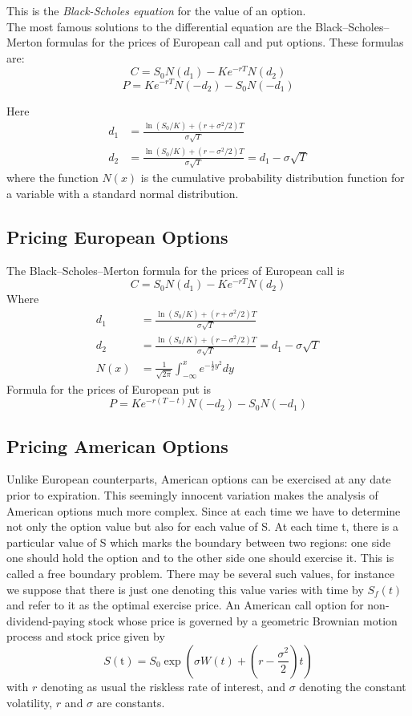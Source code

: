 \noindent This is the \emph{Black-Scholes equation} for the value of an option.\\[2mm]
The most famous solutions to the differential equation are the Black–Scholes–Merton formulas for the prices of European call and put options. These formulas are:\\
	$$
	C=S_0N(d_1)- Ke^{-rT} N(d_2)
	$$
	$$
	P= Ke^{-rT} N(-d_2)- S_0N(-d_1)
	$$

Here
$$
\begin{aligned}
	d_{1} &=\frac{\ln \left(S_{0} / K\right)+\left(r+\sigma^{2} / 2\right) T}{\sigma \sqrt{T}} \\
	d_{2} &=\frac{\ln \left(S_{0} / K\right)+\left(r-\sigma^{2} / 2\right) T}{\sigma \sqrt{T}}=d_{1}-\sigma \sqrt{T}
\end{aligned}
$$
where the function $N(x)$ is the cumulative probability distribution function for a variable with a standard normal distribution.
\subsection{ Pricing European Options}
\noindent The Black–Scholes–Merton formula  for the prices of European call is
\begin{equation}
	C=S_0N(d_1)- Ke^{-rT} N(d_2)
	\label{eq:callprice}
\end{equation}
Where
$$
\begin{aligned}
	d_{1} &=\frac{\ln \left(S_{0} / K\right)+\left(r+\sigma^{2} / 2\right) T}{\sigma \sqrt{T}} \\
	d_{2} &=\frac{\ln \left(S_{0} / K\right)+\left(r-\sigma^{2} / 2\right) T}{\sigma \sqrt{T}}=d_{1}-\sigma \sqrt{T}\\
	N(x)&=\frac{1}{\sqrt{2 \pi}} \int_{-\infty}^{x} e^{-\frac{1}{2} y^{2}} d y
\end{aligned}
$$
Formula for the prices of European put is
\begin{equation}
	P=Ke^{-r(T-t)} N(-d_2)-S_0N(-d_1) 
	\label{eq:putprice}
\end{equation}

\subsection{ Pricing American Options}
\noindent Unlike European counterparts, American options can be exercised at any date prior to expiration. This seemingly innocent variation makes the analysis of American options much more complex. Since at each time we have to determine not only the option value but also for each value of S. At each time t, there is a particular value of S which marks the boundary between two regions: one side one should hold the option and to the other side one should exercise it. This is called a free boundary problem. There may be several such values, for instance we suppose that there is just one denoting this value varies with time by $S_f(t)$ and refer to it as the optimal exercise price.
An American call option for non-dividend-paying stock whose price is governed by a geometric Brownian motion process and stock price given by
$$
S({\mathrm{t}})=S_{0} \exp \left(\sigma W(t)+\left(r-\frac{\sigma^{2}}{2}\right) t\right)
$$
with $r$ denoting as usual the riskless rate of interest, and $\sigma$ denoting the constant volatility, $r$ and $\sigma$ are constants. 
